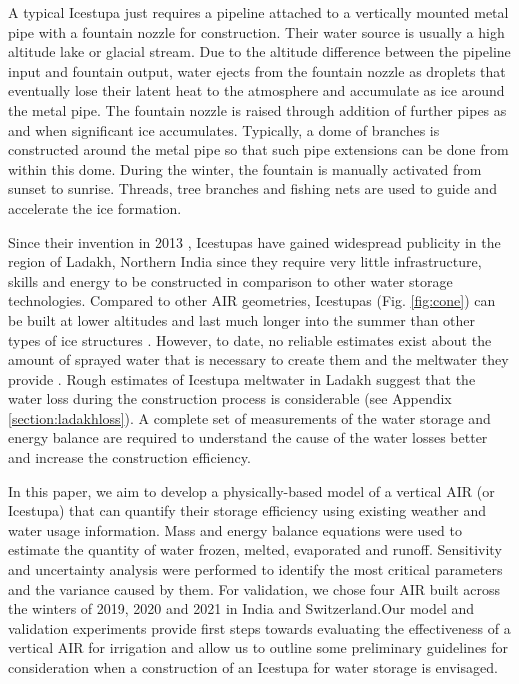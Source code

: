 \documentclass[utf8]{frontiersSCNS} %
\begin{document}
A typical Icestupa just requires a pipeline attached to a vertically mounted metal pipe with a fountain nozzle for
construction. Their water source is usually a high altitude lake or glacial stream. Due to the altitude difference
between the pipeline input and fountain output, water ejects from the fountain nozzle as droplets that eventually lose
their latent heat to the atmosphere and accumulate as ice around the metal pipe. The fountain nozzle is raised through
addition of further pipes as and when significant ice accumulates. Typically, a dome of branches is constructed around
the metal pipe so that such pipe extensions can be done from within this dome. During the winter, the fountain is
manually activated from sunset to sunrise. Threads, tree branches and fishing nets are used to guide and accelerate the
ice formation.

Since their invention in 2013 \citep{campaign}, Icestupas have gained widespread publicity in the region of Ladakh,
Northern India since they require very little infrastructure, skills and energy to be constructed in comparison to
other water storage technologies. Compared to other AIR geometries, Icestupas (Fig. \ref{fig:cone}) can be built at
lower altitudes and last much longer into the summer than other types of ice structures \citep{campaign}. However, to
date, no reliable estimates exist about the amount of sprayed water that is necessary to create them and the meltwater
they provide \citep{Nusser_2018}. Rough estimates of Icestupa meltwater in Ladakh suggest that the water loss during
the construction process is considerable (see Appendix \ref{section:ladakhloss}). A complete set of measurements of the
water storage and energy balance are required to understand the cause of the water losses better and increase the
construction efficiency.
 
In this paper, we aim to develop a physically-based model of a vertical AIR (or Icestupa) that can quantify their
storage efficiency using existing weather and water usage information. Mass and energy balance equations were used to
estimate the quantity of water frozen, melted, evaporated and runoff. Sensitivity and uncertainty analysis were
performed to identify the most critical parameters and the variance caused by them. For validation, we chose four AIR
built across the winters of 2019, 2020 and 2021 in India and Switzerland.Our model and validation experiments provide
first steps towards evaluating the effectiveness of a vertical AIR for irrigation and allow us to outline some
preliminary guidelines for consideration when a construction of an Icestupa for water storage is envisaged. 
\end{document}
